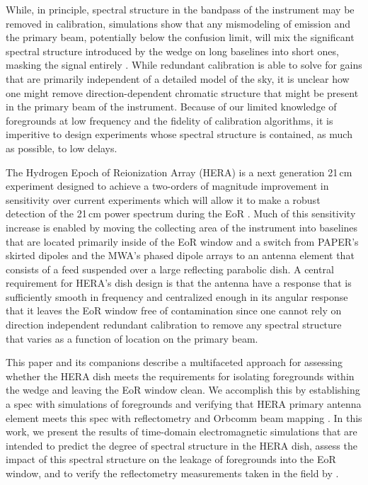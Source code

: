 \documentclass[twocolumn]{emulateapj}
\begin{document}
While, in principle, spectral structure in the bandpass of the instrument may be removed in calibration, simulations show that any mismodeling of emission and the primary beam, potentially below the confusion limit, will mix the significant spectral structure introduced by the wedge on long baselines into short ones, masking the signal entirely \citep{Barry:2016}. While redundant calibration \citep{Wieringa:1992,Liu:2011,Zheng:2014} is able to solve for gains that are primarily independent of a detailed model of the sky, it is unclear how one might remove direction-dependent chromatic structure that might be present in the primary beam of the instrument. Because of our limited knowledge of foregrounds at low frequency and the fidelity of calibration algorithms, it is imperitive to design experiments whose spectral structure is contained, as much as possible, to low delays. 

The Hydrogen Epoch of Reionization Array (HERA) is a next generation 21\,cm experiment designed to achieve a two-orders of magnitude improvement in sensitivity over current experiments which will allow it to make a robust detection of the 21\,cm power spectrum during the EoR \citep{Pober:2014}. Much of this sensitivity increase is enabled by moving the collecting area of the instrument into baselines that are located primarily inside of the EoR window and a switch from PAPER's skirted dipoles and the MWA's phased dipole arrays to an antenna element that consists of a feed suspended over a large reflecting parabolic dish. A central requirement for HERA's dish design is that the antenna have a response that is sufficiently smooth in frequency and centralized enough in its angular response that it leaves the EoR window free of contamination since one cannot rely on direction independent redundant calibration to remove any spectral structure that varies as a function of location on the primary beam. 

This paper and its companions \citep{Neben:2016,Patra:2016,Thyagarajan:2016} describe a multifaceted approach for assessing whether the HERA dish meets the requirements for isolating foregrounds within the wedge and leaving the EoR window clean. We accomplish this by establishing a spec with simulations of foregrounds \citep{Thyagarajan:2016} and verifying that HERA primary antenna element meets this spec with reflectometry \citep{Patra:2016} and Orbcomm beam mapping \citep{Neben:2016}. In this work, we present the results of time-domain electromagnetic simulations that are intended to predict the degree of spectral structure in the HERA dish, assess the impact of this spectral structure on the leakage of foregrounds into the EoR window, and to verify the reflectometry measurements taken in the field by \cite{Patra:2016}. 
\end{document}
